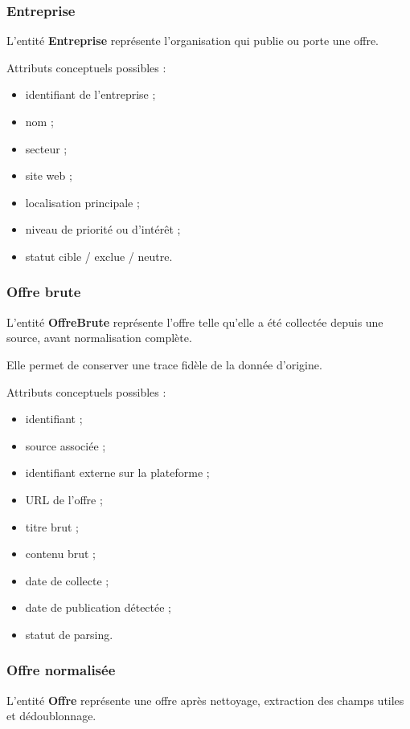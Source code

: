 \documentclass[11pt,a4paper]{article}
\begin{document}
\subsubsection{Entreprise}

L’entité \textbf{Entreprise} représente l’organisation qui publie ou porte une offre.

Attributs conceptuels possibles :
\begin{itemize}
    \item identifiant de l’entreprise ;
    \item nom ;
    \item secteur ;
    \item site web ;
    \item localisation principale ;
    \item niveau de priorité ou d’intérêt ;
    \item statut cible / exclue / neutre.
\end{itemize}

\subsubsection{Offre brute}

L’entité \textbf{OffreBrute} représente l’offre telle qu’elle a été collectée depuis une source, avant normalisation complète.

Elle permet de conserver une trace fidèle de la donnée d’origine.

Attributs conceptuels possibles :
\begin{itemize}
    \item identifiant ;
    \item source associée ;
    \item identifiant externe sur la plateforme ;
    \item URL de l’offre ;
    \item titre brut ;
    \item contenu brut ;
    \item date de collecte ;
    \item date de publication détectée ;
    \item statut de parsing.
\end{itemize}

\subsubsection{Offre normalisée}

L’entité \textbf{Offre} représente une offre après nettoyage, extraction des champs utiles et dédoublonnage.
\end{document}
